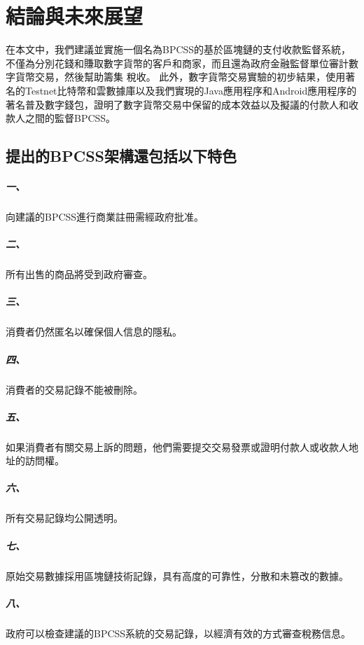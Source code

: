 
\chapter{結論與未來展望}
在本文中，我們建議並實施一個名為BPCSS的基於區塊鏈的支付收款監督系統，不僅為分別花錢和賺取數字貨幣的客戶和商家，而且還為政府金融監督單位審計數字貨幣交易，然後幫助籌集 稅收。 此外，數字貨幣交易實驗的初步結果，使用著名的Testnet比特幣和雲數據庫以及我們實現的Java應用程序和Android應用程序的著名普及數字錢包，證明了數字貨幣交易中保留的成本效益以及擬議的付款人和收款人之間的監督BPCSS。
	
	\section{提出的BPCSS架構還包括以下特色}

		\paragraph{一、}向建議的BPCSS進行商業註冊需經政府批准。
		\paragraph{二、}所有出售的商品將受到政府審查。
		\paragraph{三、}消費者仍然匿名以確保個人信息的隱私。
		\paragraph{四、}消費者的交易記錄不能被刪除。
		\paragraph{五、}如果消費者有關交易上訴的問題，他們需要提交交易發票或證明付款人或收款人地址的訪問權。
		\paragraph{六、}所有交易記錄均公開透明。
		\paragraph{七、}原始交易數據採用區塊鏈技術記錄，具有高度的可靠性，分散和未篡改的數據。
		\paragraph{八、}政府可以檢查建議的BPCSS系統的交易記錄，以經濟有效的方式審查稅務信息。

